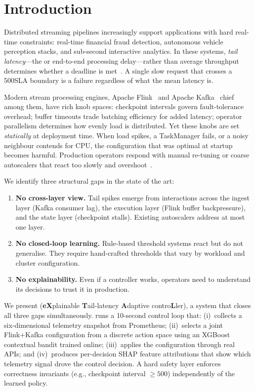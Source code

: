 \section{Introduction}
\label{sec:intro}

Distributed streaming pipelines increasingly support applications with
hard real-time constraints: real-time financial fraud detection, autonomous
vehicle perception stacks, and sub-second interactive analytics.
In these systems, \emph{tail latency}---the  or 
end-to-end processing delay---rather than average throughput determines
whether a deadline is met~\cite{dean2013tail}.
A single slow request that crosses a 500\ms SLA boundary is a failure
regardless of what the mean latency is.

Modern stream processing engines, Apache Flink~\cite{carbone2015flink}
and Apache Kafka~\cite{kreps2011kafka} chief among them, have rich knob
spaces: checkpoint intervals govern fault-tolerance overhead;
buffer timeouts trade batching efficiency for added latency;
operator parallelism determines how evenly load is distributed.
Yet these knobs are set \emph{statically} at deployment time.
When load spikes, a TaskManager fails, or a noisy neighbour contends for
CPU, the configuration that was optimal at startup becomes harmful.
Production operators respond with manual re-tuning or coarse autoscalers
that react too slowly and overshoot~\cite{welsh2001seda}.

We identify three structural gaps in the state of the art:
\begin{enumerate}
  \item \textbf{No cross-layer view.} Tail spikes emerge from interactions
    across the ingest layer (Kafka consumer lag), the execution layer
    (Flink buffer backpressure), and the state layer (checkpoint stalls).
    Existing autoscalers address at most one layer.
  \item \textbf{No closed-loop learning.} Rule-based threshold systems
    react but do not generalise. They require hand-crafted thresholds that
    vary by workload and cluster configuration.
  \item \textbf{No explainability.} Even if a controller works, operators
    need to understand its decisions to trust it in production.
\end{enumerate}

We present \xtal (\textbf{eX}plainable \textbf{T}ail-latency
\textbf{A}daptive contro\textbf{L}ler), a system that closes all three
gaps simultaneously.
\xtal runs a 10-second control loop that: (i)~collects a six-dimensional
telemetry snapshot from Prometheus; (ii)~selects a joint Flink+Kafka
configuration from a discrete action space using an XGBoost contextual
bandit trained online; (iii)~applies the configuration through real APIs;
and (iv)~produces per-decision SHAP feature attributions that show which
telemetry signal drove the control decision.
A hard safety layer enforces correctness invariants (e.g., checkpoint
interval $\geq 500$\ms) independently of the learned policy.

